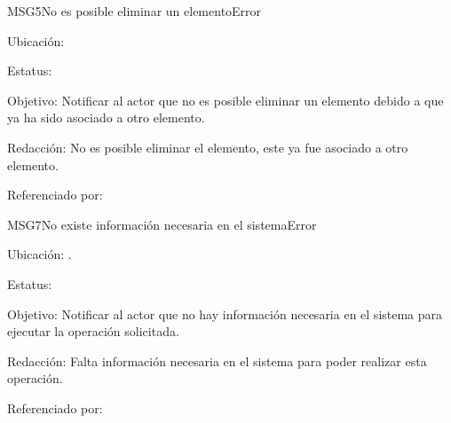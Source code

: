 \begin{mensaje}{MSG5}{No es posible eliminar un elemento}{Error}
	\item[Ubicación:] \msjEmergente
	\item[Estatus:] %
	\item[Objetivo:] Notificar al actor que no es posible eliminar un elemento debido a que ya ha sido asociado a otro elemento.
	\item[Redacción:] No es posible eliminar el elemento, este ya fue asociado a otro elemento.
	\item[Referenciado por:] 
\end{mensaje}

\begin{mensaje}{MSG7}{No existe información necesaria en el sistema}{Error}
	\item[Ubicación:] \msjSuperior.
	\item[Estatus:] %
	\item[Objetivo:] Notificar al actor que no hay información necesaria en el sistema para ejecutar la operación solicitada.
	\item[Redacción:] Falta información necesaria en el sistema para poder realizar esta operación.
	\item[Referenciado por:]
\end{mensaje}

